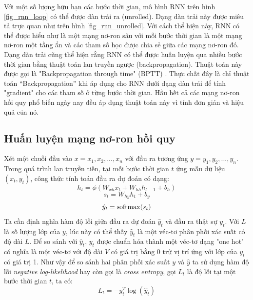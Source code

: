 Với một số lượng hữu hạn các bước thời gian, mô hình RNN trên hình \ref{fig_rnn_loop} có thể được dàn trải ra (unrolled). Dạng dàn trải này được miêu tả trực quan như trên hình \ref{fig_rnn_unrolled}. Với cách thể hiện này, RNN có thể được hiểu như là một mạng nơ-ron sâu với mỗi bước thời gian là một mạng nơ-ron một tầng ẩn và các tham số học được chia sẻ giữa các mạng nơ-ron đó. Dạng dàn trải cũng thể hiện rằng RNN có thể được huấn luyện qua nhiều bước thời gian bằng thuật toán lan truyền ngược (backpropagation). Thuật toán này được gọi là "Backpropagation through time" (BPTT) \cite{werbos1990}. Thực chất đây là chỉ thuật toán “Backpropagation” khi áp dụng cho RNN dưới dạng dàn trải để tính "gradient" cho các tham số ở từng bước thời gian. Hầu hết cả các mạng nơ-ron hồi quy phổ biến ngày nay đều áp dụng thuật toán này vì tính đơn giản và hiệu quả của nó.

\subsection{Huấn luyện mạng nơ-ron hồi quy}

Xét một chuỗi đầu vào $x={x_1,x_2,...,x_n}$ với đầu ra tương ứng $y={y_1,y_2,...,y_n}$. Trong quá trình lan truyền tiến, tại mỗi bước thời gian $t$ ứng mẫu dữ liệu $(x_t, y_t)$, công thức tính toán đầu ra dự đoán có dạng:
\begin{equation} \label{rnnForwardProp1}
h_t = \phi \left(W_{xh} x_t + W_{hh}h_{t-1} + b_h \right) 
\end{equation}
\begin{equation} \label{rnnForwardProp2}
s_t = W_{hy} h_t + b_y 
\end{equation}
\begin{equation} \label{rnnForwardProp3}
\hat{y}_t = \mathrm{softmax} (s_t) 
\end{equation}
Ta cần định nghĩa hàm độ lỗi giữa đầu ra dự đoán $\hat{y}_t$ và đầu ra thật sự $y_t$. Với $L$ là số lượng lớp của $y$, lúc này có thể thấy $\hat{y}_t$ là một véc-tơ phân phối xác suất có độ dài $L$. Để so sánh với $\hat{y}_t$, $y_t$ được chuẩn hóa thành một véc-tơ dạng "one hot" có nghĩa là một véc-tơ với độ dài $V$ có giá trị bằng 0 trừ vị trí ứng với lớp của $y_t$ có giá trị 1. Như vậy để so sánh hai phân phối xác suất $y$ và $\hat{y}$ ta sử dụng hàm độ lỗi \textit{negative log-likelihood} hay còn gọi là \textit{cross entropy}, gọi $L_t$ là độ lỗi tại một bước thời gian $t$, ta có:
\begin{equation} \label{errorOfAnExample}
L_t = -y_t^{T} \log(\hat{y}_t)
\end{equation}

